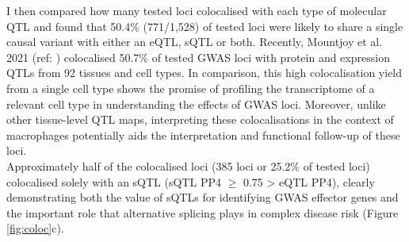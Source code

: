 I then compared how many tested loci colocalised with each type of molecular QTL and found that 50.4\% (771/1,528) of tested loci were likely to share a single causal variant with either an eQTL, sQTL or both. Recently, Mountjoy et al. 2021 (ref: \cite{Mountjoy2021-fc}) colocalised 50.7\% of tested GWAS loci with protein and expression QTLs from 92 tissues and cell types. In comparison, this high colocalisation yield from a single cell type shows the promise of profiling the transcriptome of a relevant cell type in understanding the effects of GWAS loci. Moreover, unlike other tissue-level QTL maps, interpreting these colocalisations in the context of macrophages potentially aids the interpretation and functional follow-up of these loci. \\

Approximately half of the colocalised loci (385 loci or 25.2\% of tested loci) colocalised solely with an sQTL (sQTL PP4 $\geq$ 0.75 > eQTL PP4), clearly demonstrating both the value of sQTLs for identifying GWAS effector genes and the important role that alternative splicing plays in complex disease risk (Figure \ref{fig:coloc}c). \\


